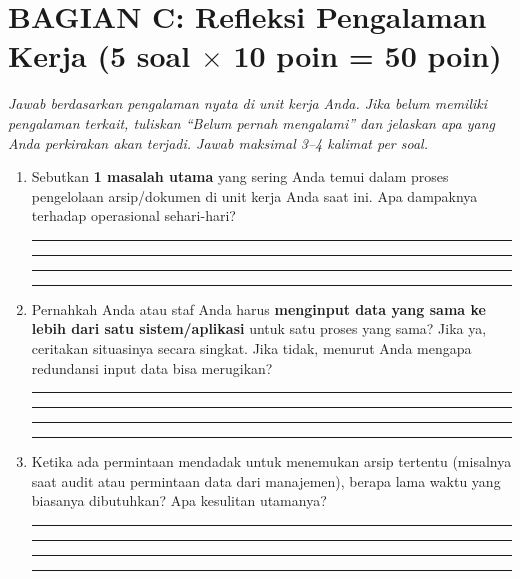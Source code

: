 \documentclass[12pt,a4paper]{report}
\begin{document}
\newpage
\section{BAGIAN C: Refleksi Pengalaman Kerja (5 soal $\times$ 10 poin = 50 poin)}
\textit{Jawab berdasarkan pengalaman nyata di unit kerja Anda. Jika belum memiliki pengalaman terkait, tuliskan ``Belum pernah mengalami'' dan jelaskan apa yang Anda perkirakan akan terjadi. Jawab maksimal 3--4 kalimat per soal.}

\vspace{0.3cm}

\begin{enumerate}[leftmargin=*, itemsep=0.3cm]

\item Sebutkan \textbf{1 masalah utama} yang sering Anda temui dalam proses pengelolaan arsip/dokumen di unit kerja Anda saat ini. Apa dampaknya terhadap operasional sehari-hari?

\vspace{0.2cm}
\noindent\rule{\textwidth}{0.3pt}
\vspace{0.5cm}
\noindent\rule{\textwidth}{0.3pt}
\vspace{0.5cm}
\noindent\rule{\textwidth}{0.3pt}
\vspace{0.5cm}
\noindent\rule{\textwidth}{0.3pt}

\item Pernahkah Anda atau staf Anda harus \textbf{menginput data yang sama ke lebih dari satu sistem/aplikasi} untuk satu proses yang sama? Jika ya, ceritakan situasinya secara singkat. Jika tidak, menurut Anda mengapa redundansi input data bisa merugikan?

\vspace{0.2cm}
\noindent\rule{\textwidth}{0.3pt}
\vspace{0.5cm}
\noindent\rule{\textwidth}{0.3pt}
\vspace{0.5cm}
\noindent\rule{\textwidth}{0.3pt}
\vspace{0.5cm}
\noindent\rule{\textwidth}{0.3pt}

\item Ketika ada permintaan mendadak untuk menemukan arsip tertentu (misalnya saat audit atau permintaan data dari manajemen), berapa lama waktu yang biasanya dibutuhkan? Apa kesulitan utamanya?

\vspace{0.2cm}
\noindent\rule{\textwidth}{0.3pt}
\vspace{0.5cm}
\noindent\rule{\textwidth}{0.3pt}
\vspace{0.5cm}
\noindent\rule{\textwidth}{0.3pt}
\vspace{0.5cm}
\noindent\rule{\textwidth}{0.3pt}


\end{enumerate}
\end{document}
